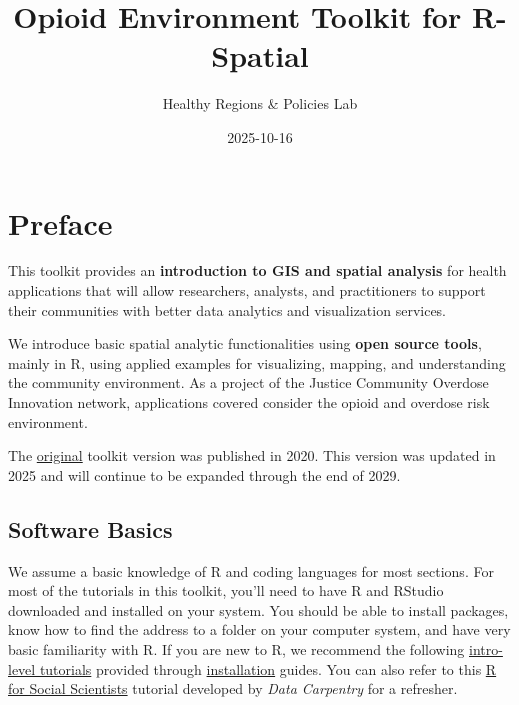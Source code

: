 \documentclass[
  letterpaper,
  DIV=11,
  numbers=noendperiod]{scrreprt}
\title{Opioid Environment Toolkit for R-Spatial}
\author{Healthy Regions \& Policies Lab}
\date{2025-10-16}
\renewcommand*\contentsname{Table of contents}
\newcommand\contentsname{Table of contents}
\begin{document}
\maketitle

\renewcommand*\contentsname{Table of contents}
{
\hypersetup{linkcolor=}
\setcounter{tocdepth}{2}
\tableofcontents
}


\chapter*{Preface}\label{preface}


This toolkit provides an \textbf{introduction to GIS and spatial
analysis} for health applications that will allow researchers, analysts,
and practitioners to support their communities with better data
analytics and visualization services.

We introduce basic spatial analytic functionalities using \textbf{open
source tools}, mainly in R, using applied examples for visualizing,
mapping, and understanding the community environment. As a project of
the Justice Community Overdose Innovation network, applications covered
consider the opioid and overdose risk environment.

The
\href{https://geodacenter.github.io/opioid-environment-toolkit/index.html}{original}
toolkit version was published in 2020. This version was updated in 2025
and will continue to be expanded through the end of 2029.

\section*{Software Basics}\label{software-basics}


We assume a basic knowledge of R and coding languages for most sections.
For most of the tutorials in this toolkit, you'll need to have R and
RStudio downloaded and installed on your system. You should be able to
install packages, know how to find the address to a folder on your
computer system, and have very basic familiarity with R. If you are new
to R, we recommend the following
\href{https://support.posit.co/hc/en-us/articles/201141096-Getting-Started-with-R}{intro-level
tutorials} provided through
\href{https://rstudio-education.github.io/hopr/starting.html}{installation}
guides. You can also refer to this
\href{https://datacarpentry.org/r-socialsci/}{R for Social Scientists}
tutorial developed by \emph{Data Carpentry} for a refresher.
\end{document}

